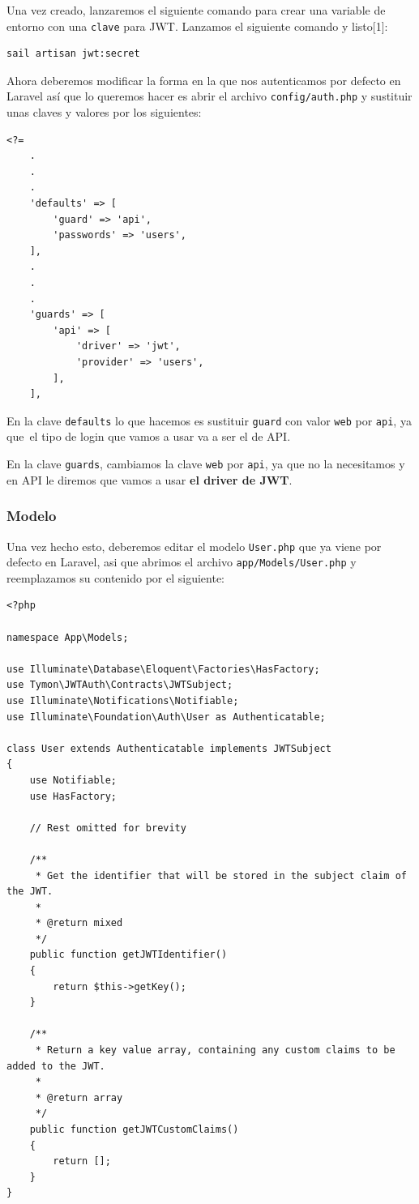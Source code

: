 \documentclass[11pt]{article}
\begin{document}
Una vez creado, lanzaremos el siguiente comando para crear una
variable de entorno con una \texttt{clave} para JWT. Lanzamos el siguiente
comando y listo[1]:
\begin{verbatim}
sail artisan jwt:secret
\end{verbatim}

Ahora deberemos modificar la forma en la que nos autenticamos por
defecto en Laravel así que lo queremos hacer es abrir el archivo
\texttt{config/auth.php} y sustituir unas claves y valores por los siguientes:
\begin{verbatim}
<?=
    .
    .
    .
    'defaults' => [
        'guard' => 'api',
        'passwords' => 'users',
    ],
    .
    .
    .
    'guards' => [
        'api' => [
            'driver' => 'jwt',
            'provider' => 'users',
        ],
    ],
\end{verbatim}

En la clave \texttt{defaults} lo que hacemos es sustituir \texttt{guard} con valor \texttt{web}
por \texttt{api}, ya que el tipo de login que vamos a usar va a ser el de API.

En la clave \texttt{guards}, cambiamos la clave \texttt{web} por \texttt{api}, ya que no la
necesitamos y en API le diremos que vamos a usar \textbf{el driver de JWT}.

\subsubsection{Modelo}
\label{sec:org4f0bf7c}
Una vez hecho esto, deberemos editar el modelo \texttt{User.php} que ya viene
por defecto en Laravel, asi que abrimos el archivo \texttt{app/Models/User.php}
y reemplazamos su contenido por el siguiente:
\begin{verbatim}
<?php

namespace App\Models;

use Illuminate\Database\Eloquent\Factories\HasFactory;
use Tymon\JWTAuth\Contracts\JWTSubject;
use Illuminate\Notifications\Notifiable;
use Illuminate\Foundation\Auth\User as Authenticatable;

class User extends Authenticatable implements JWTSubject
{
    use Notifiable;
    use HasFactory;

    // Rest omitted for brevity

    /**
     * Get the identifier that will be stored in the subject claim of the JWT.
     *
     * @return mixed
     */
    public function getJWTIdentifier()
    {
        return $this->getKey();
    }

    /**
     * Return a key value array, containing any custom claims to be added to the JWT.
     *
     * @return array
     */
    public function getJWTCustomClaims()
    {
        return [];
    }
}
\end{verbatim}
\end{document}
